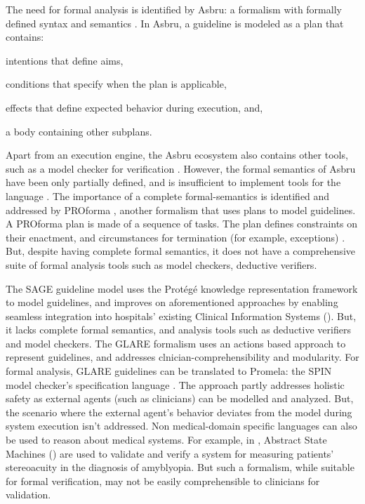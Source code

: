 The need for formal analysis is identified by Asbru: a formalism with formally
defined syntax and semantics \cite{ShaharAMIA96}. In Asbru, a guideline is modeled as a plan
that contains:
\begin{enumerate*}[label=(\roman*)]
  \item intentions that define aims,
  \item conditions that specify when the plan is applicable,
  \item effects that define expected behavior during execution, and,
  \item a body containing other subplans.
\end{enumerate*}
Apart from an execution engine, the Asbru ecosystem also contains
other tools, such as a model checker for verification \cite{BaumlerSPIN06}.
However, the formal semantics of Asbru have been only partially defined, and
is insufficient to implement tools for the language \cite{SuttonAMIA03}.
The importance of a complete formal-semantics is identified and addressed
by PROforma \cite{SuttonAMIA03}, another formalism that uses plans to
model guidelines. A PROforma plan is made of a sequence of tasks.
The plan defines constraints on their enactment, and circumstances
for termination (for example, exceptions) \cite{SuttonAMIA03}. But, despite
having complete formal semantics, it does not have a comprehensive suite of
formal analysis tools such as model checkers, deductive verifiers.


The SAGE guideline model \cite{TuSAGE04} uses the Prot\'eg\'e knowledge
representation framework \cite{NoyAMIA03} to model guidelines,
and improves on aforementioned approaches by
enabling seamless integration into hospitals' existing Clinical Information Systems
(\CISs). But, it lacks complete formal semantics, and analysis tools
such as deductive verifiers and model checkers.
The GLARE formalism \cite{TerenzianiBook04} uses an actions based approach
to represent guidelines, and addresses clnician-comprehensibility and
modularity. For formal analysis, GLARE guidelines can be translated to
Promela: the SPIN model checker's specification language \cite{GiordanoAMIA06}.
The approach partly addresses holistic safety as
external agents (such as clinicians) can be modelled and analyzed.
But, the scenario where the external agent's behavior
deviates from the model during system execution isn't addressed.
Non medical-domain specific languages can also be used to reason about
medical systems. For example, in \cite{ArcainiMEMCODE15}, Abstract State
Machines (\ASMs) are used to validate and verify a system for measuring
patients' stereoacuity in the diagnosis of amyblyopia. But such a
formalism, while suitable for formal verification, may
not be easily comprehensible to clinicians for validation.

